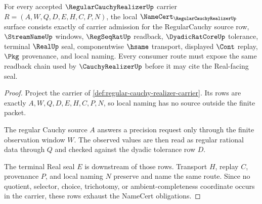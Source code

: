 \begin{theorem}
\label{thm:regular-cauchy-realizer-namecert-obligations}
For every accepted $\RegularCauchyRealizerUp$ carrier $R=(A,W,Q,D,E,H,C,P,N)$, the local $\NameCert_{\RegularCauchyRealizerUp}$ surface consists exactly of carrier admission for the RegularCauchy source row, $\StreamNameUp$ windows, $\RegSeqRatUp$ readback, $\DyadicRatCoreUp$ tolerance, terminal $\RealUp$ seal, componentwise $\hsame$ transport, displayed $\Cont$ replay, $\Pkg$ provenance, and local naming. Every consumer route must expose the same readback chain used by $\CauchyRealizerUp$ before it may cite the Real-facing seal.
\end{theorem}
\begin{proof}
Project the carrier of \autoref{def:regular-cauchy-realizer-carrier}. Its rows are exactly $A,W,Q,D,E,H,C,P,N$, so local naming has no source outside the finite packet.

The regular Cauchy source $A$ answers a precision request only through the finite observation window $W$. The observed values are then read as regular rational data through $Q$ and checked against the dyadic tolerance row $D$.

The terminal Real seal $E$ is downstream of those rows. Transport $H$, replay $C$, provenance $P$, and local naming $N$ preserve and name the same route. Since no quotient, selector, choice, trichotomy, or ambient-completeness coordinate occurs in the carrier, these rows exhaust the NameCert obligations.
\end{proof}

